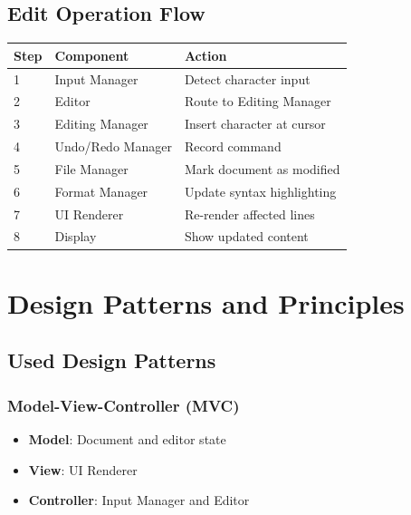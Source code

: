 \documentclass[12pt,a4paper,oneside,openany]{report}
\begin{document}
\vspace{2cm}
\section{Edit Operation Flow}

\begin{table}[H]
	\centering
	\begin{tabular}{|l|l|l|}
		\hline
		\textbf{Step} & \textbf{Component} & \textbf{Action}            \\
		\hline
		1             & Input Manager      & Detect character input     \\
		\hline
		2             & Editor             & Route to Editing Manager   \\
		\hline
		3             & Editing Manager    & Insert character at cursor \\
		\hline
		4             & Undo/Redo Manager  & Record command             \\
		\hline
		5             & File Manager       & Mark document as modified  \\
		\hline
		6             & Format Manager     & Update syntax highlighting \\
		\hline
		7             & UI Renderer        & Re-render affected lines   \\
		\hline
		8             & Display            & Show updated content       \\
		\hline
	\end{tabular}
\end{table}

\chapter{Design Patterns and Principles}

\section{Used Design Patterns}

\subsection{Model-View-Controller (MVC)}

\begin{itemize}
	\item \textbf{Model}: Document and editor state
	\item \textbf{View}: UI Renderer
	\item \textbf{Controller}: Input Manager and Editor
\end{itemize}
\end{document}

